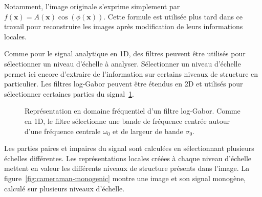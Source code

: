 Notamment, l'image originale s'exprime simplement par $f(\mathbf{x}) = A(\mathbf{x})\cos(\phi(\mathbf{x}))$. Cette formule est utilisée plus tard dans ce travail pour reconstruire les images après modification de leurs informations locales.

\bigskip

Comme pour le signal analytique en 1D, des filtres peuvent être utilisés pour sélectionner un niveau d'échelle à analyser. Sélectionner un niveau d'échelle permet ici encore d'extraire de l'information sur certains niveaux de structure en particulier. Les filtres log-Gabor peuvent être étendus en 2D et utilisés pour sélectionner certaines parties du signal~\ref{fig:2D-log-gabor}.

\bigskip

\begin{figure}
    \centering

    \caption[Filtre log-Gabor en 2D]{Représentation en domaine fréquentiel d'un filtre log-Gabor. Comme en 1D, le filtre sélectionne une bande de fréquence centrée autour d'une fréquence centrale $\omega_0$ et de largeur de bande $\sigma_0$.}
    \label{fig:2D-log-gabor}
\end{figure}

Les parties paires et impaires du signal sont calculées en sélectionnant plusieurs échelles différentes. Les représentations locales créées à chaque niveau d'échelle mettent en valeur les différents niveaux de structure présents dans l'image. La figure~\ref{fig:cameraman-monogenic} montre une image et son signal monogène, calculé sur plusieurs niveaux d'échelle.

